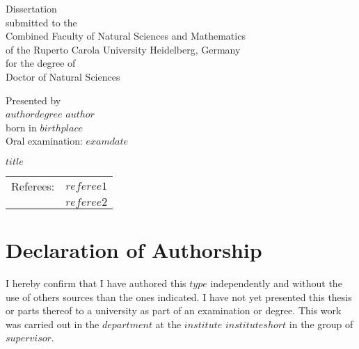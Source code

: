 \documentclass[a4paper,11pt]{article}
\newcommand{\thesistype}{$type$}
\begin{document}
\thispagestyle{empty}
\begin{center}
  {\Large{Dissertation\\
    submitted to the\\
    Combined Faculty of Natural Sciences and Mathematics\\
    of the Ruperto Carola University Heidelberg, Germany\\
    for the degree of\\
    Doctor of Natural Sciences\\}} \vspace*{\fill}

  \Large{Presented by} \\\vspace{0.5cm}
  \Large{$authordegree$ $author$} \\
  \Large{born in $birthplace$} \\
  \Large{Oral examination: $examdate$}

\end{center}
\newpage\null\thispagestyle{empty}\newpage


\pagebreak
\thispagestyle{empty}
\null
\begin{center}
\Large{$title$} \\
\vspace*{\fill}
\begin{tabular}{ c c }
Referees: & $referee1$ \\
          & $referee2$
\end{tabular}
\end{center}
\newpage\null\thispagestyle{empty}\newpage


\newpage
\thispagestyle{empty}
\hypertarget{declaration-of-authorship}{%
\section*{Declaration of Authorship}\label{declaration-of-authorship}}

I hereby confirm that I have authored this \thesistype{} independently and
without the use of others sources than the ones indicated. I have not yet
presented this thesis or parts thereof to a university as part of an
examination or degree. This work was carried out in the $department$ at
the $institute$ $instituteshort$ in the group of $supervisor$.
\vspace{1cm}
\end{document}
